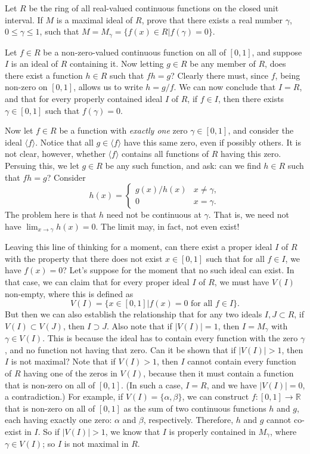 \documentclass[12pt]{article}
\newcommand{\R}{\mathbb{R}}
\begin{document}
Let $R$ be the ring of all real-valued continuous functions on the closed unit interval.
If $M$ is a maximal ideal of $R$, prove that there exists a real number $\gamma$,
$0\leq\gamma\leq 1$, such that $M=M_{\gamma}=\{f(x)\in R|f(\gamma)=0\}$.

Let $f\in R$ be a non-zero-valued continuous function on all of $[0,1]$, and suppose $I$ is an ideal of $R$
containing it.  Now letting $g\in R$ be any member of $R$, does there exist a function $h\in R$ such that
$fh=g$?  Clearly there must, since $f$, being non-zero on $[0,1]$, allows us to write $h=g/f$.
We can now conclude that $I=R$, and that for every properly contained ideal $I$ of $R$, if $f\in I$,
then there exists $\gamma\in[0,1]$ such that $f(\gamma)=0$.

Now let $f\in R$ be a function with {\it exactly one} zero $\gamma\in[0,1]$, and consider the ideal $\langle f\rangle$.
Notice that all $g\in\langle f\rangle$ have this same zero, even if possibly others.
It is not clear, however, whether $\langle f\rangle$ contains all functions of $R$ having this zero.
Persuing this, we let $g\in R$ be any such function, and ask: can we find $h\in R$ such that $fh=g$?  Consider
\begin{equation*}
h(x)=\left\{\begin{array}{ll} g(x)/h(x) & x\neq\gamma, \\ 0 & x=\gamma. \end{array}\right.
\end{equation*}
The problem here is that $h$ need not be continuous at $\gamma$.  That is, we need not have
$\lim_{x\to\gamma} h(x)=0$.  The limit may, in fact, not even exist!

Leaving this line of thinking for a moment, can there exist a proper ideal $I$ of $R$ with the
property that there does not exist $x\in[0,1]$ such that for all $f\in I$, we have $f(x)=0$?
Let's suppose for the moment that no such ideal can exist.  In that case, we can claim that
for every proper ideal $I$ of $R$, we must have $V(I)$ non-empty, where this is defined as
\begin{equation*}
V(I)=\{x\in[0,1]|\mbox{$f(x)=0$ for all $f\in I$}\}.
\end{equation*}
But then we can also establish the relationship that for any two ideals $I,J\subset R$,
if $V(I)\subset V(J)$, then $I\supset J$.  Also note that if $|V(I)|=1$, then $I=M_{\gamma}$
with $\gamma\in V(I)$.  This is because the ideal has to contain every function with the zero $\gamma$,
and no function not having that zero.  Can it be shown that if $|V(I)|>1$, then $I$ is not maximal?
Note that if $V(I)>1$, then $I$ cannot contain every function of $R$ having one of the zeros in $V(I)$,
because then it must contain a function that is non-zero on all of $[0,1]$.  (In such a case, $I=R$, and we have $|V(I)|=0$,
a contradiction.)  For example, if $V(I)=\{\alpha,\beta\}$, we can construct $f:[0,1]\to\R$ that is non-zero on all of $[0,1]$
as the sum of two continuous functions $h$ and $g$, each having exactly one zero: $\alpha$ and $\beta$, respectively.
Therefore, $h$ and $g$ cannot co-exist in $I$.
So if $|V(I)|>1$, we know that $I$ is properly contained in $M_{\gamma}$, where $\gamma\in V(I)$;
so $I$ is not maximal in $R$.
\end{document}
